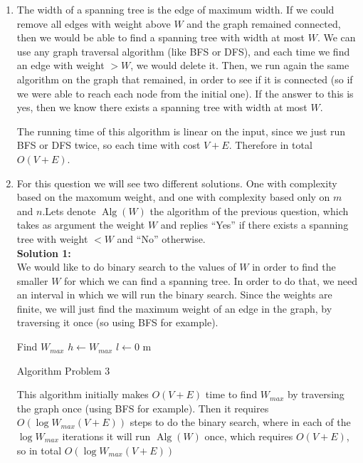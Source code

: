 \documentclass{article}
\begin{document}
\begin{enumerate}
	\item The width of a spanning tree is the edge of maximum width. If we
could remove all edges with weight above $W$ and the graph remained connected,
then we would be able to find a spanning tree with width at most $W$. We can
use any graph traversal algorithm (like BFS or DFS), and each time we find an
edge with weight $>W$, we would delete it. Then, we run again the same
algorithm on the graph that remained, in order to see if it is connected (so if
we were able to reach each node from the initial one).  If the answer to this
is yes, then we know there exists a spanning tree with width at most $W$.

The running time of this algorithm is linear on the input, since we just run
BFS or DFS twice, so each time with cost $V+E$. Therefore in total $O(V+E)$.

	\item For this question we will see two different solutions. One with
complexity based on the maxomum weight, and one with complexity based only on
$m$ and $n$.Lets denote $\operatorname{Alg}(W)$ the algorithm of the previous question, which
takes as argument the weight $W$ and replies ``Yes'' if there exists a spanning
tree with weight $<W$ and ``No'' otherwise. \\

\textbf{Solution 1:}\\
 We would like to do binary search to the values of $W$ in order to find the
smaller $W$ for which we can find a spanning tree. In order to do that, we need
an interval in which we will run the binary search. Since the weights are
finite, we will just find the maximum weight of an edge in the graph, by
traversing it once (so using BFS for example).

\begin{algorithm}
Find $W_{max}$\;
$h\leftarrow W_{max}$\;
$l\leftarrow 0$\;
\Return m\;
\caption{Algorithm Problem 3}
\end{algorithm}

This algorithm initially makes $O(V+E)$ time to find $W_{max}$ by traversing
the graph once (using BFS for example). Then it requires $O(\log W_{max}
(V+E))$ steps to do the binary search, where in each of the $\log W_{max}$
iterations it will run $\operatorname{Alg}(W)$ once, which requires $O(V+E)$,
so in total $O(\log W_{max}(V+E))$


\end{enumerate}
\end{document}
